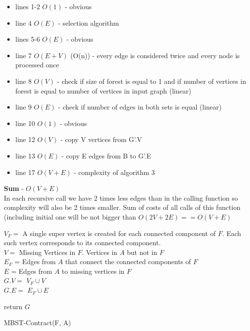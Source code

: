 \documentclass[runningheads, a4paper]{llncs}
\begin{document}
        \begin{itemize}
            \item lines 1-2 $O(1)$ - obvious
            \item line 4 $O(E)$ - selection algorithm
            \item lines 5-6 $O(E)$ - obvious
            \item line 7 $O(E+V)$ (O(n)) - every edge is considered twice and every node is processed once
            \item line 8 $O(V)$ - check if size of forest is equal to 1 and if number of vertices in forest is equal to number of vertices in input graph (linear)
            \item line 9 $O(E)$ - check if number of edges  in both sets is equal (linear)
            \item line 10 $O(1)$ - obvious
            \item line 12 $O(V)$ - copy V vertices from G'.V
            \item line 13 $O(E)$ - copy E edges from B to G'.E
            \item line 17 $O(V+E)$ - complexity of algorithm 3
        \end{itemize}
        \textbf{Sum} - $O(V + E)$ \\
        
        
        In each recursive call we have 2 times less edges than in the calling function so complexity will also be 2 times smaller. Sum of costs of all calls of this function (including initial one will be not bigger than $O(2V + 2E) == O(V+E)$
        
        
        \begin{algorithm}[h]
            
            $V_{F} = $ A single super vertex is created for each connected component of $F$. Each such vertex corresponds to its connected component. \\
            $V = $ Missing Vertices in $F$. Vertices in $A$ but not in $F$ \\
            
            $E_{F}$ = Edges from $A$ that connect the connected components of $F$\\
            $E$ = Edges from $A$ to missing vertices in $F$ \\
            
            $G.V = $ $V_{F} \cup V $ \\
            $G.E = $ $E_{F} \cup E $
            
            return $G$
            
            \caption{MBST-Contract(F, A)}
            \label{alg:mbst_contract}
        \end{algorithm}
        
\end{document}
